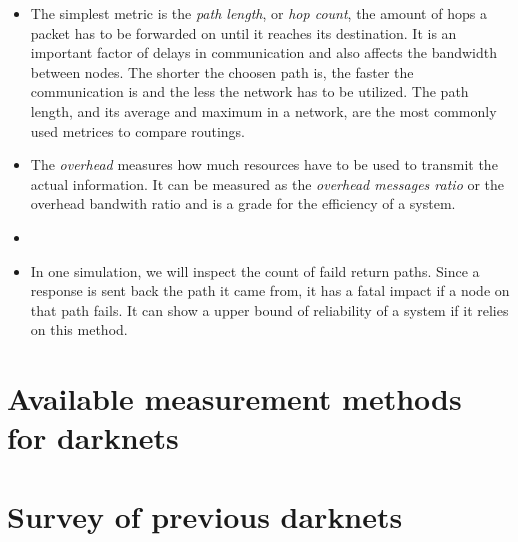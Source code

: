 \begin{itemize}
\item The simplest metric is the \emph{path length}, or \emph{hop count}, the amount of hops a packet has to be forwarded on until it reaches its destination. It is an important factor of delays in communication and also affects the bandwidth between nodes. The shorter the choosen path is, the faster the communication is and the less the network has to be utilized. The path length, and its average and maximum in a network, are the most commonly used metrices to compare routings.

\item The \emph{overhead} measures how much resources have to be used to transmit the actual information. It can be measured as the \emph{overhead messages ratio} or the overhead bandwith ratio and is a grade for the efficiency of a system.

\item 

\item In one simulation, we will inspect the count of faild return paths. Since a response is sent back the path it came from, it has a fatal impact if a node on that path fails. It can show a upper bound of reliability of a system if it relies on this method.
\end{itemize}

\section{Available measurement methods for darknets}


\section{Survey of previous darknets}


